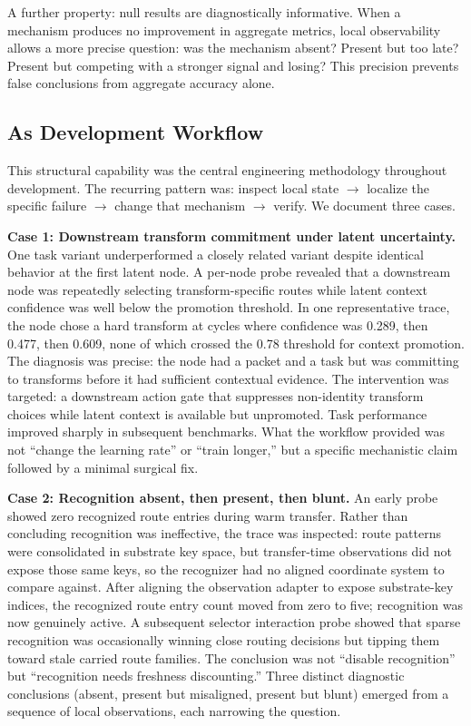 \documentclass[letterpaper]{article}
\begin{document}
A further property: null results are diagnostically informative. When a mechanism
produces no improvement in aggregate metrics, local observability allows a more
precise question: was the mechanism absent? Present but too late? Present but
competing with a stronger signal and losing? This precision prevents false
conclusions from aggregate accuracy alone.

\subsection{As Development Workflow}

This structural capability was the central engineering methodology throughout
development. The recurring pattern was: inspect local state $\rightarrow$ localize
the specific failure $\rightarrow$ change that mechanism $\rightarrow$ verify. We
document three cases.

\textbf{Case 1: Downstream transform commitment under latent uncertainty.} One
task variant underperformed a closely related variant despite identical behavior at
the first latent node. A per-node probe revealed that a downstream node was
repeatedly selecting transform-specific routes while latent context confidence was
well below the promotion threshold. In one representative trace, the node chose a
hard transform at cycles where confidence was 0.289, then 0.477, then 0.609, none
of which crossed the 0.78 threshold for context promotion. The diagnosis was
precise: the node had a packet and a task but was committing to transforms before
it had sufficient contextual evidence. The intervention was targeted: a downstream
action gate that suppresses non-identity transform choices while latent context is
available but unpromoted. Task performance improved sharply in subsequent
benchmarks. What the workflow provided was not ``change the learning rate'' or
``train longer,'' but a specific mechanistic claim followed by a minimal surgical
fix.

\textbf{Case 2: Recognition absent, then present, then blunt.} An early probe
showed zero recognized route entries during warm transfer. Rather than concluding
recognition was ineffective, the trace was inspected: route patterns were
consolidated in substrate key space, but transfer-time observations did not expose
those same keys, so the recognizer had no aligned coordinate system to compare
against. After aligning the observation adapter to expose substrate-key indices,
the recognized route entry count moved from zero to five; recognition was now
genuinely active. A subsequent selector interaction probe showed that sparse
recognition was occasionally winning close routing decisions but tipping them
toward stale carried route families. The conclusion was not ``disable recognition''
but ``recognition needs freshness discounting.'' Three distinct diagnostic
conclusions (absent, present but misaligned, present but blunt) emerged from a
sequence of local observations, each narrowing the question.
\end{document}

